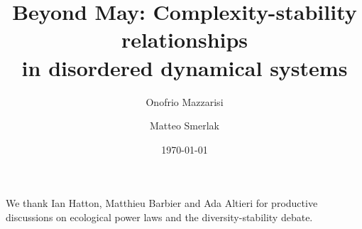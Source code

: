 \documentclass[
 prl,
 twocolumn,
 amsmath,
 amssymb,
 aps,
]{revtex4-2}
\begin{document}
\title{Beyond May: Complexity-stability relationships \\
in disordered dynamical systems}

\author{Onofrio Mazzarisi}

\author{Matteo Smerlak}


\date{\today}

\begin{abstract}

\end{abstract}
\maketitle

\paragraph*{}


\paragraph*{}


\paragraph*{}


\paragraph*{}


\paragraph*{}


\paragraph*{}


\medskip

\begin{acknowledgments}
We thank Ian Hatton, Matthieu Barbier and Ada Altieri for productive discussions on ecological power laws and the diversity-stability debate. 
\end{acknowledgments}

\medskip



\end{document}
